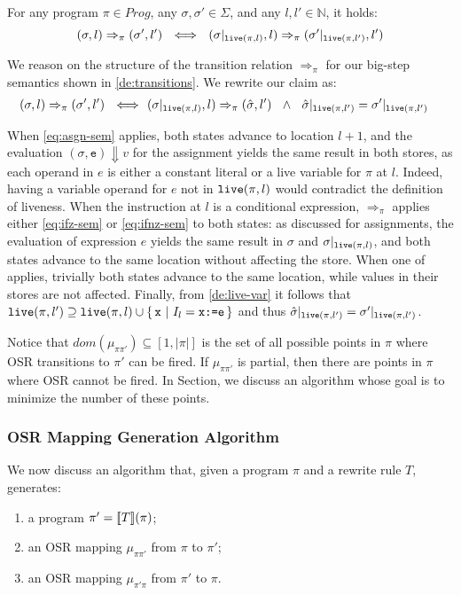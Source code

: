 \begin{lemma}
\label{le:only-live-count}
For any program $\pi\in Prog$, any $\sigma,\sigma'\in\Sigma$, and any $l,l'\in \mathbb{N}$, it holds: 
$$
(\sigma,l)\Rightarrow_{\pi}(\sigma',l') ~~ \Longleftrightarrow ~~ (\sigma\vert_{\text{${\tt live}$}(\pi,l)},l)\Rightarrow_{\pi}(\sigma'\vert_{\text{${\tt live}$}(\pi,l')},l')
$$
\end{lemma}

\begin{myproof}
We reason on the structure of the transition relation $\Rightarrow_{\pi}$ for our big-step semantics shown in \ref{de:transitions}. We rewrite our claim as:
\begin{align*}
(\sigma,l)\Rightarrow_{\pi}(\sigma',l') ~~ \Longleftrightarrow ~~ & (\sigma\vert_{\text{${\tt live}$}(\pi,l)},l)\Rightarrow_{\pi}(\hat{\sigma},l') ~~
\wedge ~~ \hat{\sigma}\vert_{\text{${\tt live}$}(\pi,l')} = \sigma'\vert_{\text{${\tt live}$}(\pi,l')} 
\end{align*}

\noindent When \ref{eq:asgn-sem} applies, both states advance to location $l+1$, and the evaluation $(\sigma, \texttt{e}) \Downarrow v$ for the assignment yields the same result in both stores, as each operand in $e$ is either a constant literal or a live variable for $\pi$ at $l$. Indeed, having a variable operand for $e$ not in $\text{${\tt live}$}(\pi,l)$ would contradict the definition of liveness. When the instruction at $l$ is a conditional expression, $\Rightarrow_{\pi}$ applies either \ref{eq:ifz-sem} or \ref{eq:ifnz-sem} to both states: as discussed for assignments, the evaluation of expression $e$ yields the same result in $\sigma$ and $\sigma\vert_{\text{${\tt live}$}(\pi,l)}$, and both states advance to the same location without affecting the store. When one of  applies, trivially both states advance to the same location, while values in their stores are not affected. Finally, from \ref{de:live-var} it follows that $\text{${\tt live}$}(\pi,l')\supseteq\text{${\tt live}$}(\pi,l)\cup\{\,\texttt{x} ~ | ~ I_l=\texttt{x:=e}\,\}$ and thus $\hat{\sigma}\vert_{\text{${\tt live}$}(\pi,l')} = \sigma'\vert_{\text{${\tt live}$}(\pi,l')}$.
\end{myproof}

\noindent Notice that $dom(\mu_{\pi\pi'})\subseteq [1,|\pi|]$ is the set of all possible points in $\pi$ where OSR transitions to $\pi'$ can be fired. If $\mu_{\pi\pi'}$ is partial, then there are points in $\pi$ where OSR cannot be fired. In Section\missing, we discuss an algorithm whose goal is to minimize the number of these points.


\subsubsection{OSR Mapping Generation Algorithm}
We now discuss an algorithm that, given a program $\pi$ and a rewrite rule $T$, generates:
\begin{enumerate}[itemsep=0pt,parsep=3pt]
 \item a program $\pi'=[\![T]\!](\pi)$;
 \item an OSR mapping $\mu_{\pi\pi'}$ from $\pi$ to $\pi'$;
 \item an OSR mapping $\mu_{\pi'\pi}$ from $\pi'$ to $\pi$.
\end{enumerate}

